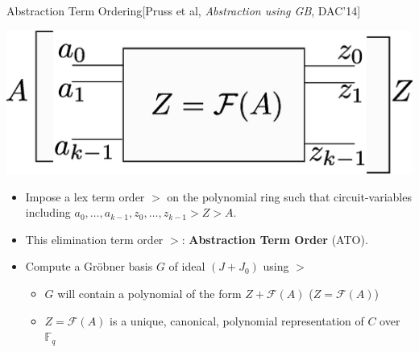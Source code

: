 \documentclass[xcolor=dvipsnames]{beamer}
\newcommand{\Fq}{{\mathbb{F}}_{q}}
\newcommand{\F}{{\mathcal{F}}}
\begin{document}
\begin{frame}{\large {Abstraction Term Ordering[Pruss et al, {\it Abstraction using GB}, DAC'14]}}

\centerline{
\includegraphics[scale=0.4]{interpolate.eps}
}
\begin{itemize}

\item Impose a lex term order $>$ on the polynomial ring such that \alert{circuit-variables including $a_0,\dots,a_{k-1},z_0,\dots,z_{k-1}> Z > A$}.
\item This elimination term order $>$: 
{\bf Abstraction Term Order} (ATO).

\item Compute a Gr\"obner basis $G$ of ideal $(J
+ J_0)$ using $>$
	\begin{itemize}
	\item $G$ will contain a polynomial of the form $Z + \F(A)$ ($Z = \F(A)$)
	\item $Z = \F(A)$ is a \alert{unique, canonical, polynomial}
  representation of $C$ over $\Fq$ 
	\end{itemize}
\end{itemize}
\end{frame}
\end{document}

